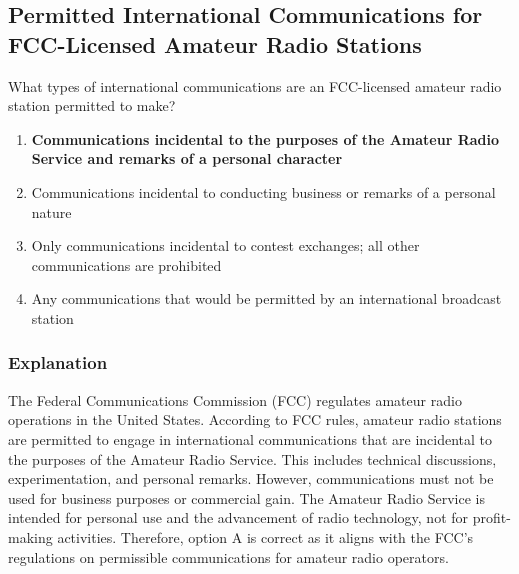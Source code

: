 \subsection{Permitted International Communications for FCC-Licensed Amateur Radio Stations}
\label{T1C03}

\begin{tcolorbox}[colback=gray!10!white,colframe=black!75!black,title=T1C03]
What types of international communications are an FCC-licensed amateur radio station permitted to make?
\begin{enumerate}[label=\Alph*]
    \item \textbf{Communications incidental to the purposes of the Amateur Radio Service and remarks of a personal character}
    \item Communications incidental to conducting business or remarks of a personal nature
    \item Only communications incidental to contest exchanges; all other communications are prohibited
    \item Any communications that would be permitted by an international broadcast station
\end{enumerate}
\end{tcolorbox}

\subsubsection{Explanation}
The Federal Communications Commission (FCC) regulates amateur radio operations in the United States. According to FCC rules, amateur radio stations are permitted to engage in international communications that are incidental to the purposes of the Amateur Radio Service. This includes technical discussions, experimentation, and personal remarks. However, communications must not be used for business purposes or commercial gain. The Amateur Radio Service is intended for personal use and the advancement of radio technology, not for profit-making activities. Therefore, option A is correct as it aligns with the FCC's regulations on permissible communications for amateur radio operators.

